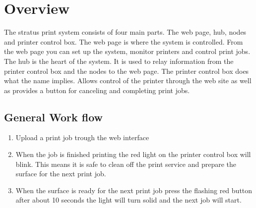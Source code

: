 


  

  \pagecolor{white}

  \tableofcontents

  \newpage
  \section{Overview}
  The stratus print system consists of four main parts. The web page, hub, nodes and printer
  control box. The web page is where the system is controlled. From the web page you can set up
  the system, monitor printers and control print jobs. The hub is the heart of the system. It is
  used to relay information from the printer control box and the nodes to the web page. The printer
  control box does what the name implies. Allows control of the printer through the web site as well
  as provides a button for canceling and completing print jobs.

  \subsection{General Work flow}
    \begin{enumerate}
      \item Upload a print job trough the web interface
      \item When the job is finished printing the red light on the printer control box
      will blink. This means it is safe to clean off the print service and prepare the
      surface for the next print job.
      \item When the surface is ready for the next print job press the flashing red button
      after about 10 seconds the light will turn solid and the next job will start.
    \end{enumerate}
  \newpage
  

  \newpage
  

  \newpage
  

  \newpage
  

  
